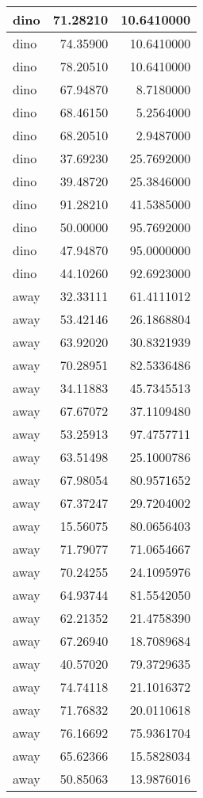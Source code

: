 \documentclass[
]{book}
\theoremstyle{definition}
\theoremstyle{definition}
\theoremstyle{definition}
\theoremstyle{definition}
\theoremstyle{remark}
\begin{document}
\begin{tabular}{l|r|r}
\hline
dino & 71.28210 & 10.6410000\\
\hline
dino & 74.35900 & 10.6410000\\
\hline
dino & 78.20510 & 10.6410000\\
\hline
dino & 67.94870 & 8.7180000\\
\hline
dino & 68.46150 & 5.2564000\\
\hline
dino & 68.20510 & 2.9487000\\
\hline
dino & 37.69230 & 25.7692000\\
\hline
dino & 39.48720 & 25.3846000\\
\hline
dino & 91.28210 & 41.5385000\\
\hline
dino & 50.00000 & 95.7692000\\
\hline
dino & 47.94870 & 95.0000000\\
\hline
dino & 44.10260 & 92.6923000\\
\hline
away & 32.33111 & 61.4111012\\
\hline
away & 53.42146 & 26.1868804\\
\hline
away & 63.92020 & 30.8321939\\
\hline
away & 70.28951 & 82.5336486\\
\hline
away & 34.11883 & 45.7345513\\
\hline
away & 67.67072 & 37.1109480\\
\hline
away & 53.25913 & 97.4757711\\
\hline
away & 63.51498 & 25.1000786\\
\hline
away & 67.98054 & 80.9571652\\
\hline
away & 67.37247 & 29.7204002\\
\hline
away & 15.56075 & 80.0656403\\
\hline
away & 71.79077 & 71.0654667\\
\hline
away & 70.24255 & 24.1095976\\
\hline
away & 64.93744 & 81.5542050\\
\hline
away & 62.21352 & 21.4758390\\
\hline
away & 67.26940 & 18.7089684\\
\hline
away & 40.57020 & 79.3729635\\
\hline
away & 74.74118 & 21.1016372\\
\hline
away & 71.76832 & 20.0110618\\
\hline
away & 76.16692 & 75.9361704\\
\hline
away & 65.62366 & 15.5828034\\
\hline
away & 50.85063 & 13.9876016\\

\end{tabular}
\end{document}
